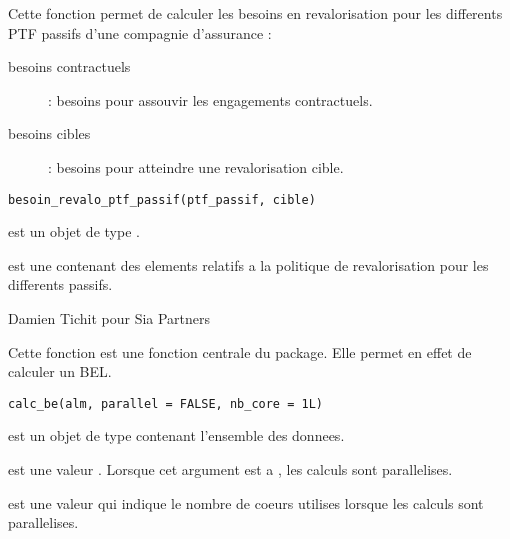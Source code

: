 \documentclass[a4paper]{book}
\begin{document}
%
\begin{Description}\relax
Cette fonction permet de calculer les besoins en revalorisation pour les differents PTF passifs d'une compagnie d'assurance :
\begin{description}

\item[besoins contractuels]  : besoins pour assouvir les engagements contractuels.
\item[besoins cibles]  : besoins pour atteindre une revalorisation cible.

\end{description}

\end{Description}
%
\begin{Usage}
\begin{verbatim}
besoin_revalo_ptf_passif(ptf_passif, cible)
\end{verbatim}
\end{Usage}
%
\begin{Arguments}
\begin{ldescription}
\item[\code{ptf\_passif}] est un objet de type .

\item[\code{cible}] est une  contenant des elements relatifs a la politique de revalorisation pour les differents passifs.
\end{ldescription}
\end{Arguments}
%
\begin{Author}\relax
Damien Tichit pour Sia Partners
\end{Author}
%
\begin{Description}\relax
Cette fonction est une fonction centrale du package. Elle permet en effet de calculer un BEL.
\end{Description}
%
\begin{Usage}
\begin{verbatim}
calc_be(alm, parallel = FALSE, nb_core = 1L)
\end{verbatim}
\end{Usage}
%
\begin{Arguments}
\begin{ldescription}
\item[\code{alm}] est un objet de type  contenant l'ensemble des donnees.

\item[\code{parallel}] est une valeur . Lorsque cet argument est a , les calculs sont parallelises.

\item[\code{nb\_core}] est une valeur  qui indique le nombre de coeurs utilises lorsque les calculs sont parallelises.
\end{ldescription}
\end{Arguments}
\end{document}
